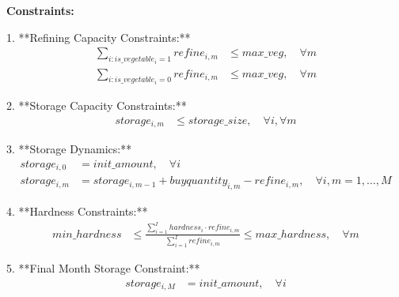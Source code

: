 \documentclass{article}
\begin{document}
\textbf{Constraints:}

1. **Refining Capacity Constraints:**
\begin{align*}
    \sum_{i: is\_vegetable_i = 1} refine_{i,m} &\leq max\_veg, \quad \forall m \\
    \sum_{i: is\_vegetable_i = 0} refine_{i,m} &\leq max\_veg, \quad \forall m
\end{align*}

2. **Storage Capacity Constraints:**
\begin{align*}
    storage_{i,m} &\leq storage\_size, \quad \forall i, \forall m
\end{align*}

3. **Storage Dynamics:**
\begin{align*}
    storage_{i,0} &= init\_amount, \quad \forall i \\
    storage_{i,m} &= storage_{i,m-1} + buyquantity_{i,m} - refine_{i,m}, \quad \forall i, m = 1, \ldots, M
\end{align*}

4. **Hardness Constraints:**
\begin{align*}
    min\_hardness &\leq \frac{\sum_{i=1}^{I} hardness_{i} \cdot refine_{i,m}}{\sum_{i=1}^{I} refine_{i,m}} \leq max\_hardness, \quad \forall m
\end{align*}

5. **Final Month Storage Constraint:**
\begin{align*}
    storage_{i,M} &= init\_amount, \quad \forall i
\end{align*}
\end{document}
